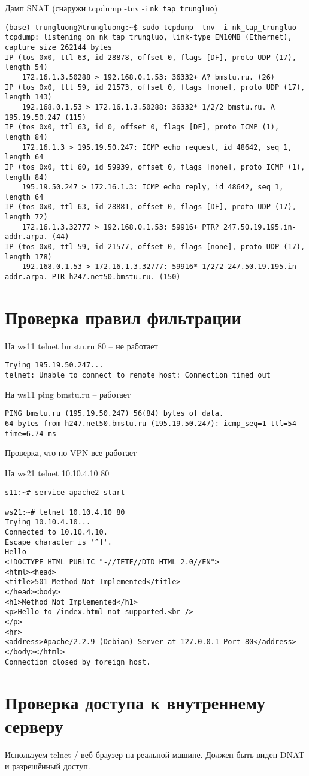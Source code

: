 \documentclass[a4paper,12pt]{article}
\begin{document}
Дамп SNAT (снаружи tcpdump -tnv -i \verb|nk_tap_trungluo|)

\begin{Verbatim}
(base) trungluong@trungluong:~$ sudo tcpdump -tnv -i nk_tap_trungluo 
tcpdump: listening on nk_tap_trungluo, link-type EN10MB (Ethernet), capture size 262144 bytes
IP (tos 0x0, ttl 63, id 28878, offset 0, flags [DF], proto UDP (17), length 54)
    172.16.1.3.50288 > 192.168.0.1.53: 36332+ A? bmstu.ru. (26)
IP (tos 0x0, ttl 59, id 21573, offset 0, flags [none], proto UDP (17), length 143)
    192.168.0.1.53 > 172.16.1.3.50288: 36332* 1/2/2 bmstu.ru. A 195.19.50.247 (115)
IP (tos 0x0, ttl 63, id 0, offset 0, flags [DF], proto ICMP (1), length 84)
    172.16.1.3 > 195.19.50.247: ICMP echo request, id 48642, seq 1, length 64
IP (tos 0x0, ttl 60, id 59939, offset 0, flags [none], proto ICMP (1), length 84)
    195.19.50.247 > 172.16.1.3: ICMP echo reply, id 48642, seq 1, length 64
IP (tos 0x0, ttl 63, id 28881, offset 0, flags [DF], proto UDP (17), length 72)
    172.16.1.3.32777 > 192.168.0.1.53: 59916+ PTR? 247.50.19.195.in-addr.arpa. (44)
IP (tos 0x0, ttl 59, id 21577, offset 0, flags [none], proto UDP (17), length 178)
    192.168.0.1.53 > 172.16.1.3.32777: 59916* 1/2/2 247.50.19.195.in-addr.arpa. PTR h247.net50.bmstu.ru. (150)
\end{Verbatim}

\section{Проверка правил фильтрации}

На ws11 telnet bmstu.ru 80 -- не работает
\begin{Verbatim}
Trying 195.19.50.247...
telnet: Unable to connect to remote host: Connection timed out
\end{Verbatim}

На ws11 ping bmstu.ru -- работает
\begin{Verbatim}
PING bmstu.ru (195.19.50.247) 56(84) bytes of data.
64 bytes from h247.net50.bmstu.ru (195.19.50.247): icmp_seq=1 ttl=54 time=6.74 ms
\end{Verbatim}

Проверка, что по VPN все работает

На ws21 telnet 10.10.4.10 80

\begin{Verbatim}
s11:~# service apache2 start

ws21:~# telnet 10.10.4.10 80
Trying 10.10.4.10...
Connected to 10.10.4.10.
Escape character is '^]'.
Hello
<!DOCTYPE HTML PUBLIC "-//IETF//DTD HTML 2.0//EN">
<html><head>
<title>501 Method Not Implemented</title>
</head><body>
<h1>Method Not Implemented</h1>
<p>Hello to /index.html not supported.<br />
</p>
<hr>
<address>Apache/2.2.9 (Debian) Server at 127.0.0.1 Port 80</address>
</body></html>
Connection closed by foreign host.
\end{Verbatim}

\section{Проверка доступа к внутреннему серверу}

Используем telnet / веб-браузер на реальной машине. 
Должен быть виден DNAT и разрешённый доступ.
\end{document}
